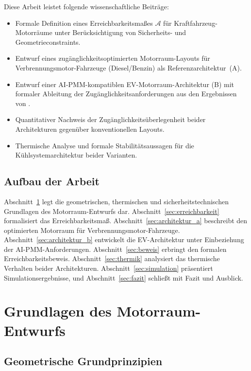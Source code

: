 ﻿\documentclass[12pt,a4paper]{article}
\begin{document}
Diese Arbeit leistet folgende wissenschaftliche Beiträge:

\begin{itemize}[leftmargin=*]
	\item Formale Definition eines Erreichbarkeitsmaßes $\mathcal{A}$ für
	Kraftfahrzeug-Motorräume unter Berücksichtigung von Sicherheits- und
	Geometrieconstraints.
	\item Entwurf eines zugänglichkeitsoptimierten Motorraum-Layouts für
	Verbrennungsmotor-Fahrzeuge (Diesel/Benzin) als Referenzarchitektur~(A).
	\item Entwurf einer AI-PMM-kompatiblen EV-Motorraum-Architektur (B) mit
	formaler Ableitung der Zugänglichkeitsanforderungen aus den Ergebnissen
	von \cite{Epp2026liion}.
	\item Quantitativer Nachweis der Zugänglichkeitsüberlegenheit beider
	Architekturen gegenüber konventionellen Layouts.
	\item Thermische Analyse und formale Stabilitätsaussagen für die
	Kühlsystemarchitektur beider Varianten.
\end{itemize}

\subsection{Aufbau der Arbeit}

Abschnitt~\ref{sec:grundlagen} legt die geometrischen, thermischen und
sicherheitstechnischen Grundlagen des Motorraum-Entwurfs dar. Abschnitt~\ref{sec:erreichbarkeit}
formalisiert das Erreichbarkeitsmaß. Abschnitt~\ref{sec:architektur_a} beschreibt
den optimierten Motorraum für Verbrennungsmotor-Fahrzeuge. Abschnitt~\ref{sec:architektur_b}
entwickelt die EV-Architektur unter Einbeziehung der AI-PMM-Anforderungen.
Abschnitt~\ref{sec:beweis} erbringt den formalen Erreichbarkeitsbeweis.
Abschnitt~\ref{sec:thermik} analysiert das thermische Verhalten beider Architekturen.
Abschnitt~\ref{sec:simulation} präsentiert Simulationsergebnisse, und
Abschnitt~\ref{sec:fazit} schließt mit Fazit und Ausblick.

\section{Grundlagen des Motorraum-Entwurfs}
\label{sec:grundlagen}

\subsection{Geometrische Grundprinzipien}
\end{document}
